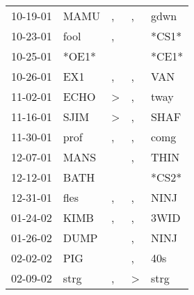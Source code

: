 \begin{supertabular}{p{0.07\textwidth}p{0.06\textwidth}p{0.02\textwidth}p{0.02\textwidth}p{0.06\textwidth}}
          10-19-01\textsuperscript{} &           MAMU\textsuperscript{} &                , &                , &           gdwn\textsuperscript{} \\
          10-23-01\textsuperscript{} &           fool\textsuperscript{} &                , &                  &                            *CS1* \\
          10-25-01\textsuperscript{} &                            *OE1* &                  &                  &                            *CE1* \\
          10-26-01\textsuperscript{} &            EX1\textsuperscript{} &                , &                , &            VAN\textsuperscript{} \\
          11-02-01\textsuperscript{} &           ECHO\textsuperscript{} &     \textgreater &                , &           tway\textsuperscript{} \\
          11-16-01\textsuperscript{} &           SJIM\textsuperscript{} &     \textgreater &                , &           SHAF\textsuperscript{} \\
          11-30-01\textsuperscript{} &           prof\textsuperscript{} &                , &                , &           comg\textsuperscript{} \\
          12-07-01\textsuperscript{} &           MANS\textsuperscript{} &                  &                , &           THIN\textsuperscript{} \\
          12-12-01\textsuperscript{} &           BATH\textsuperscript{} &                  &                  &                            *CS2* \\
          12-31-01\textsuperscript{} &           fles\textsuperscript{} &                , &                , &           NINJ\textsuperscript{} \\
          01-24-02\textsuperscript{} &           KIMB\textsuperscript{} &                , &                , &           3WID\textsuperscript{} \\
          01-26-02\textsuperscript{} &           DUMP\textsuperscript{} &                  &                , &           NINJ\textsuperscript{} \\
          02-02-02\textsuperscript{} &            PIG\textsuperscript{} &                  &                , &            40s\textsuperscript{} \\
          02-09-02\textsuperscript{} &           strg\textsuperscript{} &                , &     \textgreater &           strg\textsuperscript{} \\

\end{supertabular}
